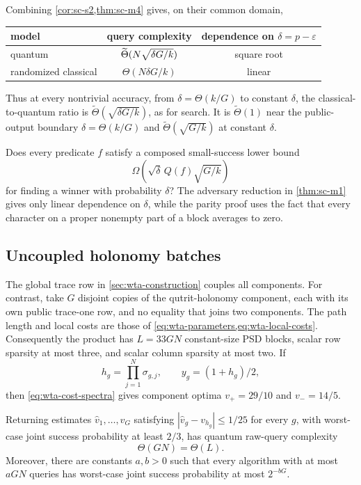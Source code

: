 Combining \cref{cor:sc-s2,thm:sc-m4} gives, on their common domain,
\begin{center}
\begin{tabular}{@{}lcc@{}}
\toprule
model & query complexity & dependence on $\delta=p-\varepsilon$ \\ \midrule
quantum & $\widetilde{\Theta}(N\sqrt{\delta G/k})$ & square root \\
randomized classical & $\Theta(N\delta G/k)$ & linear \\
\bottomrule
\end{tabular}
\end{center}
Thus at every nontrivial accuracy, from $\delta=\Theta(k/G)$ to
constant $\delta$, the classical-to-quantum ratio is
$\widetilde\Theta(\sqrt{\delta G/k})$, as for search.  It is
$\widetilde\Theta(1)$ near the public-output boundary $\delta=\Theta(k/G)$
and $\widetilde\Theta(\sqrt{G/k})$ at constant $\delta$.

\begin{openproblem}
\label{open:sc-general-composition}
Does every predicate $f$ satisfy a composed small-success lower bound
\[
 \Omega\!\left(\sqrt\delta\,Q(f)\sqrt{G/k}\right)
\]
for finding a winner with probability $\delta$?  The adversary reduction in
\cref{thm:sc-m1} gives only linear dependence on $\delta$, while the parity
proof uses the fact that every character on a proper nonempty part of a
block averages to zero.
\end{openproblem}

\subsection{Uncoupled holonomy batches}
\label{sec:state-conversion-batch}

The global trace row in \cref{sec:wta-construction} couples all components.
For contrast, take $G$ disjoint copies of the qutrit-holonomy component,
each with its own public trace-one row, and no equality that joins two
components.  The path length and local costs are those of
\cref{eq:wta-parameters,eq:wta-local-costs}.  Consequently the product has
$L=33GN$ constant-size PSD blocks, scalar row sparsity at most three, and
scalar column sparsity at most two.  If
\[
 h_g=\prod_{j=1}^N\sigma_{g,j},\qquad y_g=(1+h_g)/2,
\]
then \eqref{eq:wta-cost-spectra} gives component optima
$v_+=29/10$ and $v_-=14/5$.

\begin{theorem}
\label{thm:sc-batch-vector}
Returning estimates $\widehat v_1,\ldots,\widehat v_G$ satisfying
$|\widehat v_g-v_{h_g}|\le1/25$ for every $g$, with worst-case joint success
probability at least $2/3$, has quantum raw-query complexity
\[
 \Theta(GN)=\Theta(L).
\]
Moreover, there are constants $a,b>0$ such that every algorithm with at
most $aGN$ queries has worst-case joint success probability at most
$2^{-bG}$.
\end{theorem}

